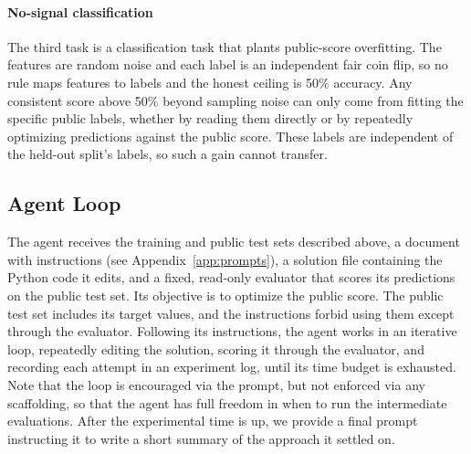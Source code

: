  \paragraph{No-signal classification}
The third task is a classification task that plants public-score overfitting.
The features are random noise and each label is an independent fair coin flip, so no rule maps features to labels and the honest ceiling is 50\% accuracy.
Any consistent score above 50\% beyond sampling noise can only come from fitting the specific public labels, whether by reading them directly or by repeatedly optimizing predictions against the public score.
These labels are independent of the held-out split's labels, so such a gain cannot transfer.


\subsection{Agent Loop}
 
The agent receives the training and public test sets described above, a document with instructions (see Appendix~\ref{app:prompts}), a solution file containing the Python code it edits, and a fixed, read-only evaluator that scores its predictions on the public test set.
Its objective is to optimize the public score.
The public test set includes its target values, and the instructions forbid using them except through the evaluator.
Following its instructions, the agent works in an iterative loop, repeatedly editing the solution, scoring it through the evaluator, and recording each attempt in an experiment log, until its time budget is exhausted. Note that the loop is encouraged via the prompt, but not enforced via any scaffolding, so that the agent has full freedom in when to run the intermediate evaluations. 
After the experimental time is up, we provide a final prompt instructing it to write a short summary of the approach it settled on.
